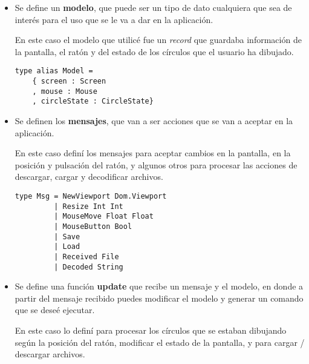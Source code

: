 \documentclass[12pt]{article}
\begin{document}
\begin{itemize}
\item Se define un \textbf{modelo}, que puede ser un tipo de dato cualquiera que sea de interés para el uso que se le va a dar en la aplicación.

  En este caso el modelo que utilicé fue un \textit{record} que guardaba información de la pantalla, el ratón y del estado de los círculos que el usuario ha dibujado.

  \begin{verbatim}
type alias Model =
    { screen : Screen
    , mouse : Mouse
    , circleState : CircleState}
  \end{verbatim}

\item Se definen los \textbf{mensajes}, que van a ser acciones que se van a aceptar en la aplicación.

  En este caso definí los mensajes para aceptar cambios en la pantalla, en la posición y pulsación del ratón, y algunos otros para procesar las acciones de descargar, cargar y decodificar archivos.

  \begin{verbatim}
type Msg = NewViewport Dom.Viewport
         | Resize Int Int
         | MouseMove Float Float
         | MouseButton Bool
         | Save
         | Load
         | Received File
         | Decoded String
  \end{verbatim}

\item Se define una función \textbf{update} que recibe un mensaje y el modelo, en donde a partir del mensaje recibido puedes modificar el modelo y generar un comando que se deseé ejecutar.

  En este caso lo definí para procesar los círculos que se estaban dibujando según la posición del ratón, modificar el estado de la pantalla, y para cargar / descargar archivos.


\end{itemize}
\end{document}
